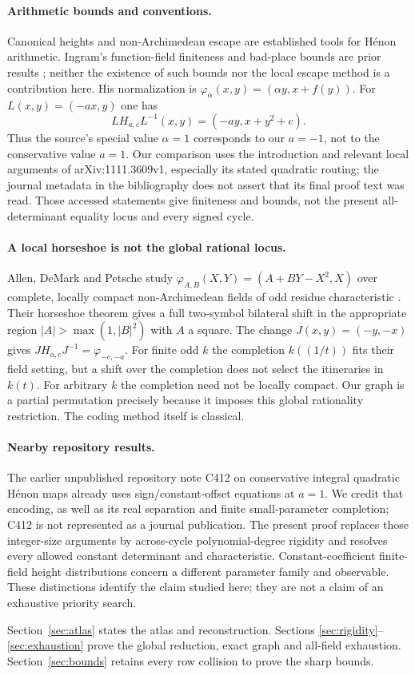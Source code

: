 \paragraph{Arithmetic bounds and conventions.}
Canonical heights and non-Archimedean escape are established tools for
H\'enon arithmetic. Ingram's function-field finiteness and bad-place
bounds are prior results \citep{ingram2014canonical}; neither the
existence of such bounds nor the local escape method is a contribution
here. His normalization is
$\varphi_\alpha(x,y)=(\alpha y,x+f(y))$. For
$L(x,y)=(-a x,y)$ one has
\[
 L H_{a,c}L^{-1}(x,y)=(-a y,x+y^2+c).
\]
Thus the source's special value $\alpha=1$ corresponds to our $a=-1$,
not to the conservative value $a=1$. Our comparison uses the
introduction and relevant local arguments of arXiv:1111.3609v1,
especially its stated quadratic routing; the journal metadata in the
bibliography does not assert that its final proof text was read.
Those accessed statements give finiteness and bounds, not the present
all-determinant equality locus and every signed cycle.

\paragraph{A local horseshoe is not the global rational locus.}
Allen, DeMark and Petsche study
$\varphi_{A,B}(X,Y)=(A+B Y-X^2,X)$ over complete, locally compact
non-Archimedean fields of odd residue characteristic
\citep{allen2018nonarchimedean}. Their horseshoe theorem gives a full
two-symbol bilateral shift in the appropriate region
$|A|>\max(1,|B|^2)$ with $A$ a square.
The change $J(x,y)=(-y,-x)$ gives
$JH_{a,c}J^{-1}=\varphi_{-c,-a}$.
For finite odd $k$ the completion $k((1/t))$ fits their field setting,
but a shift over the completion does not select the itineraries in
$k(t)$. For arbitrary $k$ the completion need not be locally compact.
Our graph is a partial permutation precisely because it imposes this
global rationality restriction. The coding method itself is classical.

\paragraph{Nearby repository results.}
The earlier unpublished repository note C412 on conservative integral
quadratic H\'enon maps already uses sign/constant-offset equations at
$a=1$. We credit that encoding, as well as its real separation and
finite small-parameter completion; C412 is not represented as a journal
publication. The present proof replaces those integer-size arguments
by across-cycle polynomial-degree rigidity and resolves every allowed
constant determinant and characteristic. Constant-coefficient
finite-field height distributions concern a different parameter family
and observable. These distinctions identify the claim studied here;
they are not a claim of an exhaustive priority search.

Section~\ref{sec:atlas} states the atlas and reconstruction. Sections
\ref{sec:rigidity}--\ref{sec:exhaustion} prove the global reduction,
exact graph and all-field exhaustion. Section~\ref{sec:bounds}
retains every row collision to prove the sharp bounds.
